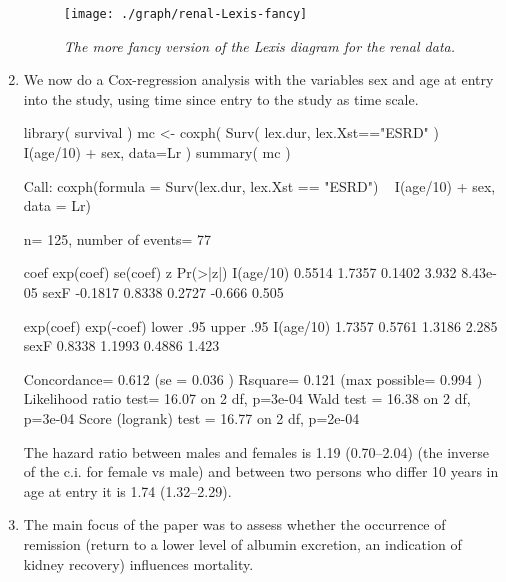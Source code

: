 \begin{enumerate}
\begin{figure}[tb]
  \centering
  \texttt{[image: ./graph/renal-Lexis-fancy]}
  \caption{\it The more fancy version of the Lexis diagram for the
    renal data.}
  \label{fig:Lexis-fancy}
\end{figure}

 

\item We now do a Cox-regression analysis with the variables sex and age at
  entry into the study, using time since entry to the study as time scale.
\begin{Schunk}
\begin{Sinput}
 library( survival )
 mc <- coxph( Surv( lex.dur, lex.Xst=="ESRD" ) ~
              I(age/10) + sex, data=Lr )
 summary( mc )
\end{Sinput}
\begin{Soutput}
Call:
coxph(formula = Surv(lex.dur, lex.Xst == "ESRD") ~ I(age/10) + 
    sex, data = Lr)

  n= 125, number of events= 77 

             coef exp(coef) se(coef)      z Pr(>|z|)
I(age/10)  0.5514    1.7357   0.1402  3.932 8.43e-05
sexF      -0.1817    0.8338   0.2727 -0.666    0.505

          exp(coef) exp(-coef) lower .95 upper .95
I(age/10)    1.7357     0.5761    1.3186     2.285
sexF         0.8338     1.1993    0.4886     1.423

Concordance= 0.612  (se = 0.036 )
Rsquare= 0.121   (max possible= 0.994 )
Likelihood ratio test= 16.07  on 2 df,   p=3e-04
Wald test            = 16.38  on 2 df,   p=3e-04
Score (logrank) test = 16.77  on 2 df,   p=2e-04
\end{Soutput}
\end{Schunk}
The hazard ratio between males and females is 1.19 (0.70--2.04) (the
inverse of the c.i. for female vs male) and between two persons who
differ 10 years in age at entry it is 1.74 (1.32--2.29).


\item The main focus of the paper was to assess whether the occurrence
  of remission (return to a lower level of albumin excretion, an
  indication of kidney recovery) influences mortality.


\end{enumerate}
